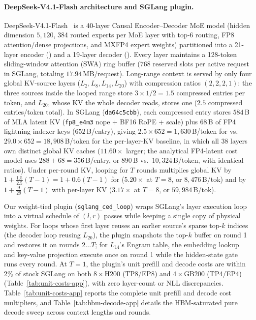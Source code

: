 \paragraph{DeepSeek-V4.1-Flash architecture and SGLang plugin.}
DeepSeek-V4.1-Flash~\citep{deepseekv41} is a 40-layer Causal Encoder--Decoder MoE model (hidden dimension $5{,}120$, 384 routed experts per MoE layer with top-6 routing, FP8 attention/dense projections, and MXFP4 expert weights) partitioned into a 21-layer encoder () and a 19-layer decoder ().
Every layer maintains a 128-token sliding-window attention (SWA) ring buffer ($768$ reserved slots per active request in SGLang, totaling $17.94$\,MB/request).
Long-range context is served by only four global KV-source layers ($L_2, L_8, L_{14}, L_{20}$) with compression ratios $(2, 2, 2, 1)$: the three sources inside the looped range  store $3 \times 1/2 = 1.5$ compressed entries per token, and $L_{20}$, whose KV the whole decoder reads, stores one ($2.5$ compressed entries/token total).
In SGLang (\texttt{da64c5cbb}), each compressed entry stores $584$\,B of MLA latent KV (\texttt{fp8\_e4m3} nope + BF16 RoPE + scale) plus $68$\,B of FP4 lightning-indexer keys ($652$\,B/entry), giving $2.5 \times 652 = 1{,}630$\,B/token for \ced vs.\ $29.0 \times 652 = 18{,}908$\,B/token for the per-layer-KV baseline, in which all 38 layers  own distinct global KV caches ($11.60\times$ larger; the analytical FP4-latent cost model uses $288 + 68 = 356$\,B/entry, or $890$\,B vs.\ $10{,}324$\,B/token, with identical ratios).
Under per-round KV, looping  for $T$ rounds multiplies global KV by $1 + \frac{1.5}{2.5}(T-1) = 1 + 0.6(T-1)$ for \ced ($5.20\times$ at $T=8$, or $8{,}476$\,B/tok) and by $1 + \frac{9}{29}(T-1)$ with per-layer KV ($3.17\times$ at $T=8$, or $59{,}984$\,B/tok).

Our weight-tied plugin (\texttt{sglang\_ced\_loop}) wraps SGLang's layer execution loop into a virtual schedule of $(l, r)$ passes while keeping a single copy of physical weights.
For loops whose first layer reuses an earlier source's sparse top-$k$ indices (the decoder loop  reusing $L_{20}$), the plugin snapshots the top-$k$ buffer on round 1 and restores it on rounds $2\dots T$; for $L_{14}$'s Engram table, the embedding lookup and key-value projection execute once on round 1 while the hidden-state gate runs every round.
At $T=1$, the plugin's unit prefill and decode costs are within 2\% of stock SGLang on both $8\times\text{H200}$ (TP8/EP8) and $4\times\text{GB200}$ (TP4/EP4) (Table~\ref{tab:unit-costs-app}), with zero layer-count or NLL discrepancies.
Table~\ref{tab:unit-costs-app} reports the complete unit prefill and decode cost multipliers, and Table~\ref{tab:hbm-decode-app} details the HBM-saturated pure decode sweep across context lengths and rounds.


